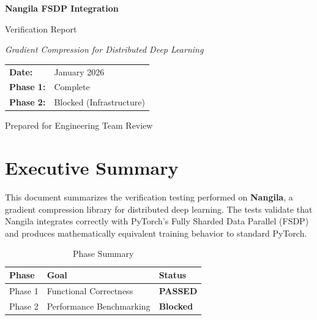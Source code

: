 \documentclass[11pt,a4paper]{article}
\begin{document}
\begin{titlepage}
    \centering
    \vspace*{2cm}
    
    {\Huge\bfseries Nangila FSDP Integration\par}
    \vspace{0.5cm}
    {\LARGE Verification Report\par}
    
    \vspace{2cm}
    
    {\Large\itshape Gradient Compression for Distributed Deep Learning\par}
    
    \vspace{3cm}
    
    \begin{tabular}{ll}
        \textbf{Date:} & January 2026 \\
        \textbf{Phase 1:} & \textcolor{pass}{Complete} \\
        \textbf{Phase 2:} & \textcolor{blocked}{Blocked (Infrastructure)} \\
    \end{tabular}
    
    \vfill
    
    {\large Prepared for Engineering Team Review\par}
    
\end{titlepage}

\tableofcontents
\newpage

\section{Executive Summary}

This document summarizes the verification testing performed on \textbf{Nangila}, a gradient compression library for distributed deep learning. The tests validate that Nangila integrates correctly with PyTorch's Fully Sharded Data Parallel (FSDP) and produces mathematically equivalent training behavior to standard PyTorch.

\begin{table}[h]
\centering
\begin{tabular}{@{}lll@{}}
\toprule
\textbf{Phase} & \textbf{Goal} & \textbf{Status} \\
\midrule
Phase 1 & Functional Correctness & \textcolor{pass}{\textbf{PASSED}} \\
Phase 2 & Performance Benchmarking & \textcolor{blocked}{\textbf{Blocked}} \\
\bottomrule
\end{tabular}
\caption{Phase Summary}
\end{table}
\end{document}
